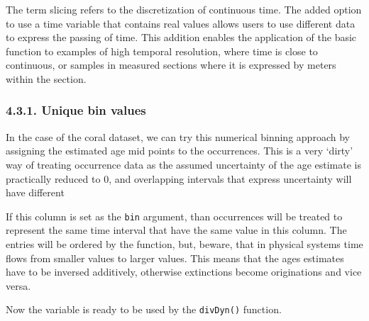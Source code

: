 \documentclass[]{article}
\newenvironment{Shaded}{\begin{snugshade}}{\end{snugshade}}
\newcommand{\DecValTok}[1]{\textcolor[rgb]{0.00,0.00,0.81}{#1}}
\newcommand{\KeywordTok}[1]{\textcolor[rgb]{0.13,0.29,0.53}{\textbf{#1}}}
\newcommand{\NormalTok}[1]{#1}
\newcommand{\OperatorTok}[1]{\textcolor[rgb]{0.81,0.36,0.00}{\textbf{#1}}}
\newcommand{\StringTok}[1]{\textcolor[rgb]{0.31,0.60,0.02}{#1}}
\begin{document}
The term slicing refers to the discretization of continuous time. The
added option to use a time variable that contains real values allows
users to use different data to express the passing of time. This
addition enables the application of the basic function to examples of
high temporal resolution, where time is close to continuous, or samples
in measured sections where it is expressed by meters within the section.

\hypertarget{unique-bin-values}{%
\subsubsection{4.3.1. Unique bin values}\label{unique-bin-values}}

In the case of the coral dataset, we can try this numerical binning
approach by assigning the estimated age mid points to the occurrences.
This is a very `dirty' way of treating occurrence data as the assumed
uncertainty of the age estimate is practically reduced to 0, and
overlapping intervals that express uncertainty will have different

\begin{Shaded}
\end{Shaded}

If this column is set as the \texttt{bin} argument, than occurrences
will be treated to represent the same time interval that have the same
value in this column. The entries will be ordered by the function, but,
beware, that in physical systems time flows from smaller values to
larger values. This means that the ages estimates have to be inversed
additively, otherwise extinctions become originations and vice versa.

\begin{Shaded}
\end{Shaded}

Now the variable is ready to be used by the \texttt{divDyn()} function.
\end{document}
